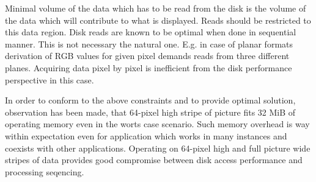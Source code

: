 Minimal volume of the data which has to be read from the disk is the volume of the data which will contribute to what is displayed. Reads should be restricted to this data region. Disk reads are known to be optimal when done in sequential manner. This is not necessary the natural one. E.g. in case of planar formats derivation of RGB values for given pixel demands reads from three different planes. Acquiring data pixel by pixel is inefficient from the disk performance perspective in this case.

In order to conform to the above constraints and to provide optimal solution, observation has been made, that 64-pixel high stripe of picture fits 32 MiB of operating memory even in the worts case scenario. Such memory overhead is way within expectation even for application which works in many instances and coexists with other applications. Operating on 64-pixel high and full picture wide stripes of data provides good compromise between disk access performance and processing seqencing.
